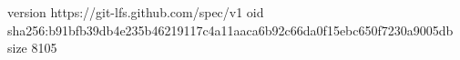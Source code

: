 version https://git-lfs.github.com/spec/v1
oid sha256:b91bfb39db4e235b46219117c4a11aaca6b92c66da0f15ebc650f7230a9005db
size 8105
